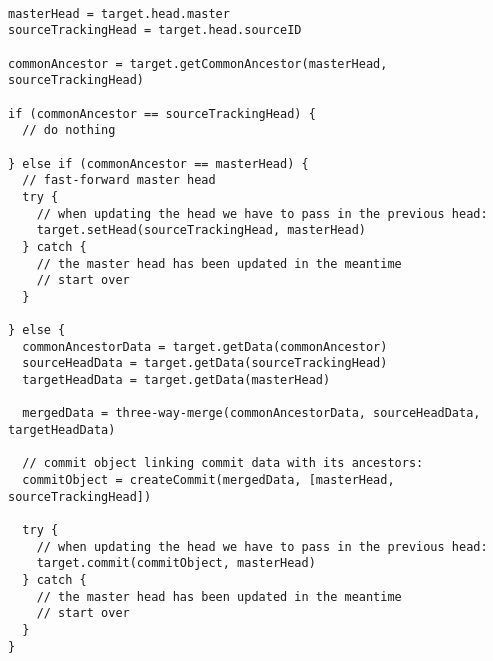 \begin{lstlisting}[caption=Merging Protocol, label=fig:histo.merging-protocol]

masterHead = target.head.master
sourceTrackingHead = target.head.sourceID

commonAncestor = target.getCommonAncestor(masterHead, sourceTrackingHead)

if (commonAncestor == sourceTrackingHead) {
  // do nothing

} else if (commonAncestor == masterHead) {
  // fast-forward master head
  try {
    // when updating the head we have to pass in the previous head:
    target.setHead(sourceTrackingHead, masterHead)
  } catch {
    // the master head has been updated in the meantime
    // start over
  }

} else {
  commonAncestorData = target.getData(commonAncestor)
  sourceHeadData = target.getData(sourceTrackingHead)
  targetHeadData = target.getData(masterHead)

  mergedData = three-way-merge(commonAncestorData, sourceHeadData, targetHeadData)

  // commit object linking commit data with its ancestors:
  commitObject = createCommit(mergedData, [masterHead, sourceTrackingHead])

  try {
    // when updating the head we have to pass in the previous head:
    target.commit(commitObject, masterHead)    
  } catch {
    // the master head has been updated in the meantime
    // start over
  }
}

\end{lstlisting}
